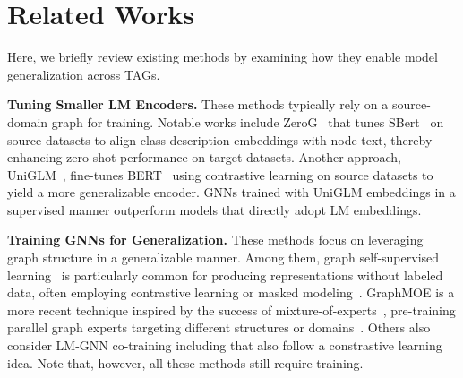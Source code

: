 \section{Related Works}
Here, we briefly review existing methods by examining how they enable model generalization across TAGs. 

\textbf{Tuning Smaller LM Encoders.} 
These methods typically rely on a source-domain graph for training. Notable works include ZeroG~\cite{li2024zerog} that tunes SBert~\cite{reimers2019sentence} on source datasets to align class-description embeddings with node text, thereby enhancing zero-shot performance on target datasets. Another approach, UniGLM~\cite{fang2024uniglm}, fine-tunes BERT~\cite{kenton2019bert} using contrastive learning on source datasets to yield a more generalizable encoder. GNNs trained with UniGLM embeddings in a supervised manner outperform models that directly adopt LM embeddings.



\textbf{Training GNNs for Generalization.} These methods focus on leveraging graph structure in a generalizable manner. Among them, graph self-supervised learning~\cite{liu2022graph} is particularly common for producing representations without labeled data, often employing contrastive learning or masked modeling~\cite{velivckovic2018deep, hou2022graphmae, zhao2024all}. GraphMOE is a more recent technique inspired by the success of mixture-of-experts~\cite{shazeer2017outrageously}, pre-training parallel graph experts targeting different structures or domains~\cite{hou2024graphalign, liu2024one, xia2024anygraph, qin2023disentangled}. 
Others also consider LM-GNN co-training including \cite{he2024unigraph,zhu2024graphclip} that also follow a constrastive learning idea. %
Note that, however, all these methods still require training.  %

